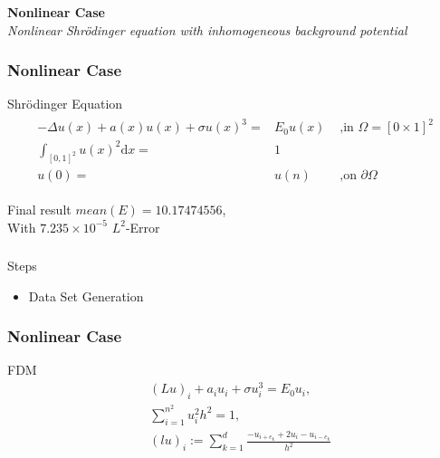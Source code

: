 \documentclass{beamer}
\begin{document}
\begin{frame}
	\frametitle{}
	
	\textbf{Nonlinear Case}\centering\\
	\textit{Nonlinear Shr\"{o}dinger equation with inhomogeneous background potential}\centering\\
	
\end{frame}
\begin{frame}
	\frametitle{Nonlinear Case}
	
	\begin{block}{Shr\"{o}dinger Equation}
		\begin{align*} 	
		\begin{array}{rll}
		-\Delta u(x) + a(x)u(x) + \sigma u(x)^3 = &E_0 u(x) &\text{ ,in }\Omega = [0\times 1]^2\\ 
		\int_{[0,1]^2}u(x)^2 \mathrm{d}x = &1\\
		u(0) = &u(n) &\text{ ,on }\partial \Omega 
		\end{array}
		\end{align*}	
	\end{block}
		\begin{block}{Final result}
		$mean(E) = 10.17474556$,\\
		With $7.235 \times 10^{-5}$ $L^2$-Error
	\end{block}
\end{frame}

\begin{frame}
	\frametitle{}	
	\begin{block}{Steps}
		\begin{itemize}
			\item Data Set Generation 
		\end{itemize}	
	\end{block}
\end{frame}


\begin{frame}
	\frametitle{Nonlinear Case}
	
	\begin{block}{FDM}	
		\begin{align*}
		&(Lu)_i + a_i u_i + \sigma u_{i}^3 = E_0 u_i, \\
		&\sum_{i=1}^{n^2} u_{i}^2 h^2 = 1,\\
		&(lu)_i := \sum_{k=1}^{d} \frac{-u_{i+e_{k}} + 2u_i - u_{i-e_{k}}}{h^2}
		\end{align*}	
	\end{block}
\end{frame}
\end{document}

